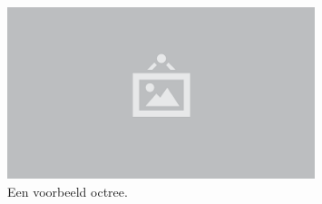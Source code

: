 \begin{figure}
  \centering
  \includegraphics[width=0.8\textwidth]{./img/raw/placeholder.png}
  \caption{Een voorbeeld octree.}
  \label{fig:hs-octree-example}
\end{figure}

